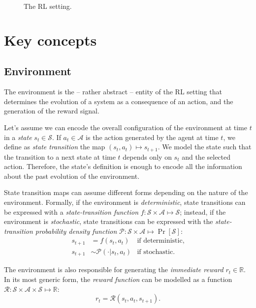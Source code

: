 \begin{figure}
    \centering
    \caption{The \acl{RL} setting.}
    \label{fig:rl_setting}
\end{figure}

\section{Key concepts}
\label{section:key_concepts}

\subsection{Environment}

The environment is the -- rather abstract -- entity of the \ac{RL} setting that determines the evolution of a system as a consequence of an action, and the generation of the reward signal.

Let's assume we can encode the overall configuration of the environment at time $t$ in a \emph{state} $s_t \in \mathcal{S}$.
If $a_t \in \mathcal{A}$ is the action generated by the agent at time $t$, we define as \emph{state transition} the map $(s_t, a_t) \mapsto s_{t+1}$.
We model the state such that the transition to a next state at time $t$ depends only on $s_t$ and the selected action.
Therefore, the state's definition is enough to encode all the information about the past evolution of the environment.

State transition maps can assume different forms depending on the nature of the environment.
Formally, if the environment is \emph{deterministic}, state transitions can be expressed with a \emph{state-transition function} $f: \mathcal{S} \times \mathcal{A} \mapsto \mathcal{S}$; instead, if the environment is \emph{stochastic}, state transitions can be expressed with the \emph{state-transition probability density function} $\mathcal{P}: \mathcal{S} \times \mathcal{A} \mapsto \operatorname{Pr}[\mathcal{S}]$:
%
\begin{equation}
\label{eq:state_transition_equations}
\begin{aligned}
    s_{t+1} &= f(s_t, a_t) &\text{if deterministic,}\\
    s_{t+1} &\sim \mathcal{P}(\cdot|s_t, a_t) &\text{if stochastic.}
\end{aligned}
\end{equation}

The environment is also responsible for generating the \emph{immediate reward} $r_t \in \mathbb{R}$.
In its most generic form, the \emph{reward function} can be modelled as a function $\mathcal{R}: \mathcal{S} \times \mathcal{A} \times \mathcal{S} \mapsto \mathbb{R}$:
%
\begin{equation*}
    r_t = \mathcal{R}(s_t, a_t, s_{t+1}) .
\end{equation*}


